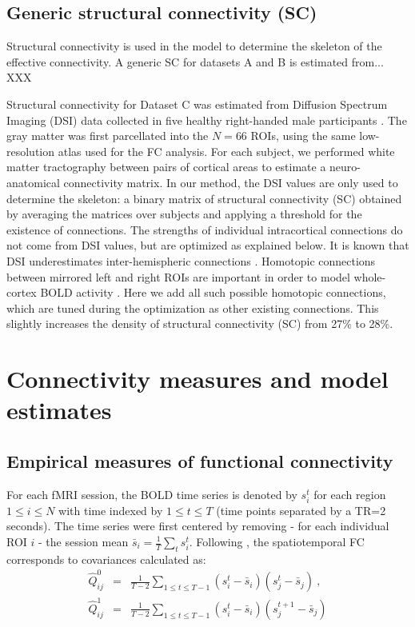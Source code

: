 \documentclass{article}
\begin{document}
\subsection{Generic structural connectivity (SC)}

Structural connectivity is used in the model to determine the skeleton of the effective connectivity. A generic SC for datasets A and B is estimated from... XXX


Structural connectivity for Dataset C was estimated from Diffusion Spectrum Imaging (DSI) data collected in five healthy right-handed male participants \cite{Hagmann_PB_2008}. The gray matter was first parcellated into the $N = 66$ ROIs, using the same low-resolution atlas used for the FC analysis. For each subject, we performed white matter tractography between pairs of cortical areas to estimate a neuro-anatomical connectivity matrix. In our method, the DSI values are only used to determine the skeleton: a binary matrix of structural connectivity (SC) obtained by averaging the matrices over subjects and applying a threshold for the existence of connections. The strengths of individual intracortical connections do not come from DSI values, but are optimized as explained below.
It is known that DSI underestimates inter-hemispheric connections \cite{Hagmann_PB_2008}. Homotopic connections between mirrored left and right ROIs are important in order to model whole-cortex BOLD activity \cite{Messe_PCB_2014}. Here we add all such possible homotopic connections, which are tuned during the optimization as other existing connections. This slightly increases the density of structural connectivity (SC) from 27\% to 28\%.


\section{Connectivity measures and model estimates}



\subsection{Empirical measures of functional connectivity}

For each fMRI session, the BOLD time series is denoted by $s_i^t$ for each region $1 \leq i \leq N$ with time indexed by $1 \leq t \leq T$ (time points separated by a TR=2 seconds). 
The time series were first centered by removing - for each individual ROI $i$ - the session mean $\bar{s}_i = \frac{1}{T} \sum_t s_i^t$. 
Following \cite{Gilson_PCB_2016}, the spatiotemporal FC corresponds to covariances calculated as:
\begin{eqnarray} \label{eq_emp_cov}
\widehat{Q}^0_{ij} & = & \frac{1}{T-2} \sum_{1 \leq t \leq T-1} (s_i^t - \bar{s}_i) (s_j^t - \bar{s}_j)
\ ,
\\
\widehat{Q}^1_{ij} & = & \frac{1}{T-2} \sum_{1 \leq t \leq T-1} (s_i^t - \bar{s}_i) (s_j^{t+1} - \bar{s}_j)
\nonumber
\end{eqnarray}
\end{document}
